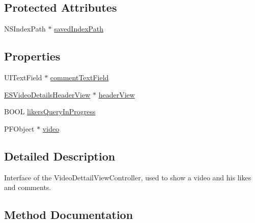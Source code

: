 \subsection*{Protected Attributes}
\begin{DoxyCompactItemize}
\item 
N\+S\+Index\+Path $\ast$ \hyperlink{interface_e_s_video_detail_view_controller_af78401fcbda8010ec3894d40a97c2393}{saved\+Index\+Path}
\end{DoxyCompactItemize}
\subsection*{Properties}
\begin{DoxyCompactItemize}
\item 
U\+I\+Text\+Field $\ast$ \hyperlink{interface_e_s_video_detail_view_controller_ae1fd28cd1174563626ee4f372973e26c}{comment\+Text\+Field}
\item 
\hyperlink{interface_e_s_video_details_header_view}{E\+S\+Video\+Details\+Header\+View} $\ast$ \hyperlink{interface_e_s_video_detail_view_controller_a3553bcf1403fea69179d17e30f864333}{header\+View}
\item 
B\+O\+O\+L \hyperlink{interface_e_s_video_detail_view_controller_a042ded94d23d82fd4e732c607c308d95}{likers\+Query\+In\+Progress}
\item 
P\+F\+Object $\ast$ \hyperlink{interface_e_s_video_detail_view_controller_a932d0b5ee570f18801ca0b9e324b23fe}{video}
\end{DoxyCompactItemize}


\subsection{Detailed Description}
Interface of the Video\+Dettail\+View\+Controller, used to show a video and his likes and comments. 

\subsection{Method Documentation}
\hypertarget{interface_e_s_video_detail_view_controller_ac238ed02fc23e01553dbe206b6a526fb}{}
